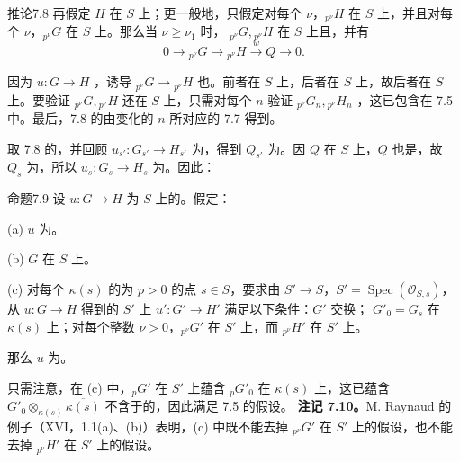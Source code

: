 \begin{SGAresult}{推论}{7.8}
再假定 $H$ 在 $S$ 上；更一般地，只假定对每个 $\nu$，${}_{p^\nu}H$ 在 $S$ 上，并且对每个 $\nu$，${}_{p^\nu}G$ 在 $S$ 上。那么当 $\nu\geq\nu_1$ 时， ${}_{p^\nu}G,{}_{p^\nu}H$ 在 $S$ 上且，并有
\[
0\longrightarrow{}_{p^\nu}G\longrightarrow{}_{p^\nu}H\xrightarrow{w}Q\longrightarrow0.
\]
\end{SGAresult}
因为 $u:G\to H$ ，诱导 ${}_{p^\nu}G\to{}_{p^\nu}H$ 也。前者在 $S$ 上，后者在 $S$ 上，故后者在 $S$ 上。要验证 ${}_{p^\nu}G,{}_{p^\nu}H$ 还在 $S$ 上，只需对每个 $n$ 验证 ${}_{p^\nu}G_n,{}_{p^\nu}H_n$ ，这已包含在 7.5 中。最后，7.8 的由变化的 $n$ 所对应的 7.7 得到。

取 7.8 的，并回顾 $u_{s'}:G_{s'}\to H_{s'}$ 为，得到 $Q_{s'}$ 为。因 $Q$ 在 $S$ 上，$Q$ 也是，故 $Q_s$ 为，所以 $u_s:G_s\to H_s$ 为。因此：
\begin{SGAresult}{命题}{7.9}
设 $u:G\to H$ 为 $S$ 上的。假定：

(a) $u$ 为。

(b) $G$ 在 $S$ 上。

(c) 对每个 $\kappa(s)$ 的为 $p>0$ 的点 $s\in S$，要求由 $S'\to S$，$S'=\operatorname{Spec}(\mathcal O_{S,s})$，从 $u:G\to H$ 得到的 $S'$ 上 $u':G'\to H'$ 满足以下条件：$G'$ 交换； $G'_0=G_s$ 在 $\kappa(s)$ 上；对每个整数 $\nu>0$，${}_{p^\nu}G'$ 在 $S'$ 上，而 ${}_{p^\nu}H'$ 在 $S'$ 上。

那么 $u$ 为。
\end{SGAresult}
只需注意，在 (c) 中，${}_pG'$ 在 $S'$ 上蕴含 ${}_pG'_0$ 在 $\kappa(s)$ 上，这已蕴含 $G'_0\otimes_{\kappa(s)}\overline{\kappa(s)}$ 不含于的，因此满足 7.5 的假设。
\textbf{注记 7.10。}M. Raynaud 的例子（XVI，1.1(a)、(b)）表明，(c) 中既不能去掉 ${}_{p^\nu}G'$ 在 $S'$ 上的假设，也不能去掉 ${}_{p^\nu}H'$ 在 $S'$ 上的假设。

